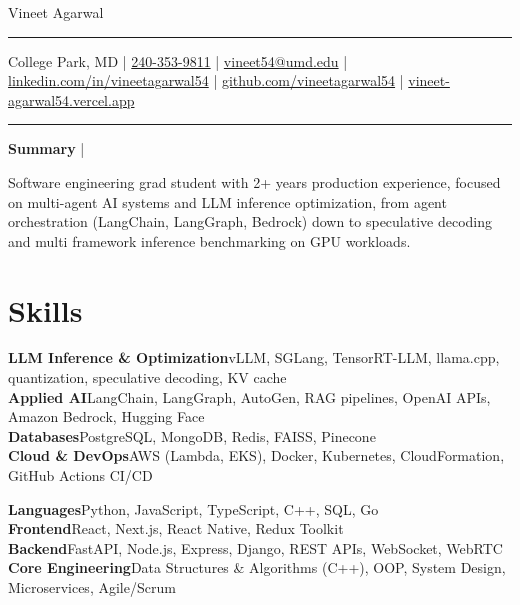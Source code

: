 \documentclass[letterpaper,10pt]{article}
\newlength{\headerRuleGap}    \setlength{\headerRuleGap}{6pt}   %
\newcommand{\skillRowSep}{1pt}                                  %
\newcommand{\documentTitle}[2]{
  \begin{center}
    {\Huge\color{accentTitle} #1}
    \vspace{\headerRuleGap}
    {\color{accentLine} \hrule}
    \vspace{2pt}
    \footnotesize{#2}
    \vspace{2pt}
    {\color{accentLine} \hrule}
  \end{center}
}
\newcommand{\tinysection}[1]{
  \phantomsection
  \addcontentsline{toc}{section}{#1}
  {\large{\bfseries\color{accentText}#1} {\color{accentLine} |}}
}
\begin{document}

  \documentTitle{Vineet Agarwal}{
    College Park, MD |
    \href{tel:2403539811}{240-353-9811} |
    \href{mailto:vineet54@umd.edu}{vineet54@umd.edu} |
    \href{https://www.linkedin.com/in/vineetagarwal54/}{linkedin.com/in/vineetagarwal54} |
    \href{https://github.com/vineetagarwal54}{github.com/vineetagarwal54} |
    \href{https://vineet-agarwal54.vercel.app/}{vineet-agarwal54.vercel.app}
  }


  \tinysection{Summary}
  Software engineering grad student with 2+ years production experience, focused on multi-agent AI systems and LLM inference optimization, from agent orchestration (LangChain, LangGraph, Bedrock) down to speculative decoding and multi framework inference benchmarking on GPU workloads.


  \section{Skills}

\noindent
\begin{minipage}[t]{0.48\textwidth}
  \vspace{0pt}
  \textbf{LLM Inference \& Optimization}\enspace vLLM, SGLang, \mbox{TensorRT-LLM}, llama.cpp, quantization, speculative decoding, KV cache \\[\skillRowSep]
  \textbf{Applied AI}\enspace LangChain, LangGraph, AutoGen, RAG pipelines, OpenAI APIs, Amazon Bedrock, Hugging Face \\[\skillRowSep]
  \textbf{Databases}\enspace PostgreSQL, MongoDB, Redis, FAISS, Pinecone \\[\skillRowSep]
  \textbf{Cloud \& DevOps}\enspace AWS (Lambda, EKS), Docker, Kubernetes, CloudFormation, GitHub Actions CI/CD
\end{minipage}\hfill
\begin{minipage}[t]{0.48\textwidth}
  \vspace{0pt}
  \textbf{Languages}\enspace Python, JavaScript, TypeScript, C++, SQL, Go \\[\skillRowSep]
  \textbf{Frontend}\enspace React, Next.js, React Native, Redux Toolkit \\[\skillRowSep]
  \textbf{Backend}\enspace FastAPI, Node.js, Express, Django, REST APIs, WebSocket, WebRTC \\[\skillRowSep]
  \textbf{Core Engineering}\enspace Data Structures \& Algorithms (C++), OOP, System Design, Microservices, Agile/Scrum
\end{minipage}
\end{document}
